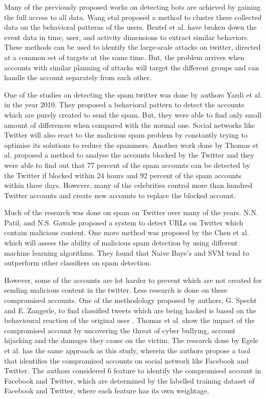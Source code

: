 \documentclass[conference]{IEEEtran}
\begin{document}
Many of the previously proposed works on detecting bots are achieved by gaining the full access to all data. Wang etal proposed a method to cluster these collected data on the behavioral patterns of the users. Beutel et al. have broken down the event data in time, user, and activity dimensions to extract similar behaviors. These methods can be used to identify the large-scale attacks on twitter, directed at a common set of targets at the same time. But, the problem arrives when accounts with similar planning of attacks will target the different groups and can handle the account separately from each other.

One of the studies on detecting the spam twitter was done by authors Yardi et al. \cite{5} in the year 2010. They proposed a behavioral pattern to detect the accounts which are purely created to send the spam. But, they were able to find only small amount of differences when compared with the normal one. Social networks like Twitter will also react to the malicious spam problem by constantly trying to optimise its solutions to reduce the spammers. Another work done by Thomas et al. \cite{6} proposed a method to analyse the accounts blocked by the Twitter and they were able to find out that 77 percent of the spam accounts can be detected by the Twitter if blocked within 24 hours and 92 percent of the spam accounts within three days. However, many of the celebrities control more than hundred Twitter accounts and create new accounts to replace the blocked account.

Much of the research was done on spam on Twitter over many of the years. N.N. Patil, and N.S. Gawale proposed a system to detect URLs on Twitter which contain malicious content\cite{7}. One more method was proposed by the Chen et al. \cite{8} which will assess the ability of malicious spam detection by using different machine learning algorithms. They found that Naive Baye's and SVM tend to outperform other classifiers on spam detection.

However, some of the accounts are lot harder to prevent which are not created for sending malicious content in the twitter. Less research is done on these compromised accounts. One of the methodology proposed by authors, G. Specht and  E. Zangerle, to find classified tweets which are being hacked is based on the behavioural reaction of the original user \cite{8}. Thomas et al. \cite{9} show the impact of the compromised account by uncovering the threat of cyber bullying, account hijacking and the damages they cause on the victim. The research done by Egele et al. \cite{10}  has the same approach as this study, wherein the authors propose a tool that identifies the compromised accounts on social network like Facebook and Twitter. The authors considered 6 feature to identify the compromised account in Facebook and Twitter, which are determined by the labelled training dataset of Facebook and Twitter, where each feature has its own weightage.
\end{document}
